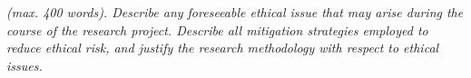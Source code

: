 % 
%
%
%

\emph{(max. 400 words). Describe any foreseeable ethical issue that may arise
  during the course of the research project. Describe all mitigation strategies
  employed to reduce ethical risk, and justify the research methodology with
  respect to ethical issues.}   





% 
